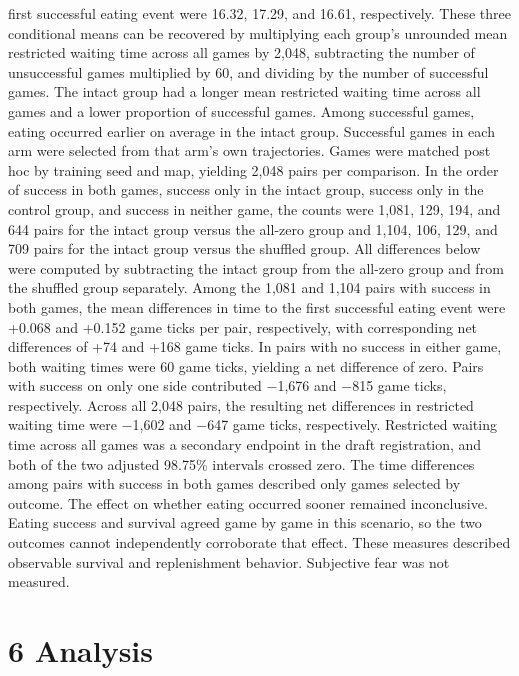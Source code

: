 \documentclass{article}
\begin{document}
first successful eating event were 16.32, 17.29, and 16.61, respectively. These three conditional means can be recovered by multiplying each group's unrounded mean restricted waiting time across all games by 2,048, subtracting the number of unsuccessful games multiplied by 60, and dividing by the number of successful games. The intact group had a longer mean restricted waiting time across all games and a lower proportion of successful games. Among successful games, eating occurred earlier on average in the intact group. Successful games in each arm were selected from that arm's own trajectories. Games were matched post hoc by training seed and map, yielding 2,048 pairs per comparison. In the order of success in both games, success only in the intact group, success only in the control group, and success in neither game, the counts were 1,081, 129, 194, and 644 pairs for the intact group versus the all-zero group and 1,104, 106, 129, and 709 pairs for the intact group versus the shuffled group. All differences below were computed by subtracting the intact group from the all-zero group and from the shuffled group separately. Among the 1,081 and 1,104 pairs with success in both games, the mean differences in time to the first successful eating event were +0.068 and +0.152 game ticks per pair, respectively, with corresponding net differences of +74 and +168 game ticks. In pairs with no success in either game, both waiting times were 60 game ticks, yielding a net difference of zero. Pairs with success on only one side contributed \ensuremath{-}1,676 and \ensuremath{-}815 game ticks, respectively. Across all 2,048 pairs, the resulting net differences in restricted waiting time were \ensuremath{-}1,602 and \ensuremath{-}647 game ticks, respectively. Restricted waiting time across all games was a secondary endpoint in the draft registration, and both of the two adjusted 98.75\% intervals crossed zero. The time differences among pairs with success in both games described only games selected by outcome. The effect on whether eating occurred sooner remained inconclusive. Eating success and survival agreed game by game in this scenario, so the two outcomes cannot independently corroborate that effect. These measures described observable survival and replenishment behavior. Subjective fear was not measured.


\section*{6 Analysis}
\end{document}
